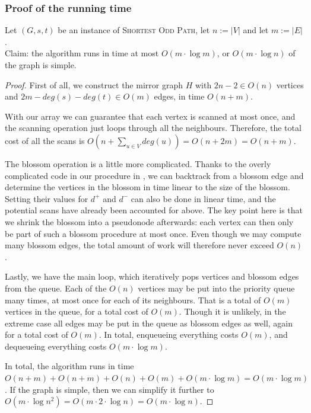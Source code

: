 \subsubsection*{Proof of the running time}
Let $(G,s,t)$ be an instance of \textsc{Shortest Odd Path}, let $n := |V|$ and let $m := |E|$. \\
Claim: the algorithm runs in time at most $O(m \cdot \log m)$, or $O(m \cdot \log n)$ of the graph is simple.
\begin{proof}  
    First of all, we construct the mirror graph $H$ with $2n-2 \in O(n)$ vertices and $2m - deg(s) - deg(t) \in O(m)$ edges, in time $O(n+m)$.
    
    With our  array we can guarantee that each vertex is scanned at most once, and the scanning operation just loops through all the neighbours. Therefore, the total cost of all the scans is $O(n + \sum_{u \in V} deg(u)) = O(n + 2m) = O(n + m)$.

    The blossom operation is a little more complicated. Thanks to the overly complicated code in our  procedure in , we can backtrack from a blossom edge and determine the vertices in the blossom in time linear to the size of the blossom. Setting their values for $d^+$ and $d^-$ can also be done in linear time, and the potential scans have already been accounted for above. The key point here is that we shrink the blossom into a pseudonode afterwards: each vertex can then only be part of such a blossom procedure at most once. Even though we may compute many blossom edges, the total amount of work will therefore never exceed $O(n)$.

    Lastly, we have the main loop, which iteratively pops vertices and blossom edges from the queue. Each of the $O(n)$ vertices may be put into the priority queue many times, at most once for each of its neighbours. That is a total of $O(m)$ vertices in the queue, for a total cost of $O(m)$. Though it is unlikely, in the extreme case all edges may be put in the queue as blossom edges as well, again for a total cost of $O(m)$. In total, enqueueing everything costs $O(m)$, and dequeueing everything costs $O(m \cdot \log m)$.

    In total, the algorithm runs in time $O(n+m) + O(n+m) + O(n) + O(m) + O(m \cdot \log m) = O(m \cdot \log m)$.
    If the graph is simple, then we can simplify it further to $O(m \cdot \log n^2) = O(m \cdot 2 \cdot \log n) = O(m \cdot \log n)$.
\end{proof}

